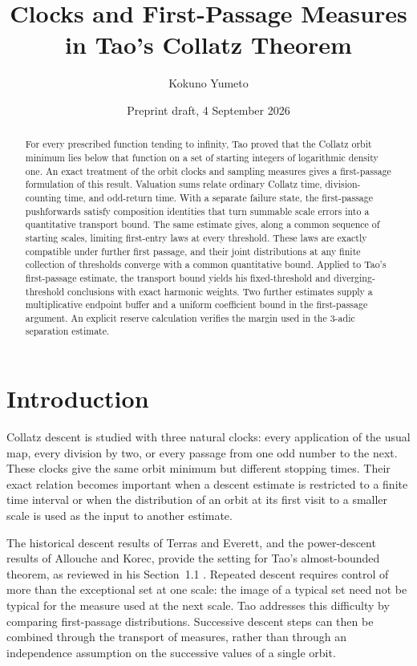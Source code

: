 \documentclass[11pt]{article}
\title{Clocks and First-Passage Measures\\in Tao's Collatz Theorem}
\author{Kokuno Yumeto}
\date{Preprint draft, 4 September 2026}
\theoremstyle{definition}
\theoremstyle{remark}
\begin{document}
\maketitle
\begin{abstract}
For every prescribed function tending to infinity, Tao proved that the
Collatz orbit minimum lies below that function on a set of starting
integers of logarithmic density one.
An exact treatment of the orbit clocks and sampling measures gives a
first-passage formulation of this result.  Valuation sums relate ordinary
Collatz time, division-counting time, and odd-return time.  With a separate
failure state, the first-passage pushforwards satisfy composition identities
that turn summable scale errors into a quantitative transport bound.  The
same estimate gives, along a common sequence of starting scales, limiting
first-entry laws at every threshold. These laws are exactly compatible
under further first passage, and their joint distributions at any finite
collection of thresholds converge with a common quantitative bound.
Applied to Tao's first-passage estimate, the transport bound
yields his fixed-threshold and diverging-threshold conclusions with exact
harmonic weights.  Two further estimates supply a multiplicative endpoint
buffer and a uniform coefficient bound in the first-passage argument.
An explicit reserve calculation verifies the margin used in the
$3$-adic separation estimate.
\end{abstract}

\section{Introduction}

Collatz descent is studied with three natural clocks: every application of
the usual map, every division by two, or every passage from one odd number
to the next.  These clocks give the same orbit minimum but different
stopping times.  Their exact relation becomes important when a descent
estimate is restricted to a finite time interval or when the distribution
of an orbit at its first visit to a smaller scale is used as the input to
another estimate.

The historical descent results of Terras and Everett, and the power-descent
results of Allouche and Korec, provide the setting for Tao's
almost-bounded theorem, as reviewed in his Section~1.1
\cite{Terras,Everett,Allouche,Korec,Tao7}.
Repeated descent requires control of more than the exceptional set at one
scale: the image of a typical set need not be typical for the measure used
at the next scale.  Tao addresses this difficulty by comparing first-passage
distributions.  Successive descent steps can then be combined through the
transport of measures, rather than through an independence assumption on
the successive values of a single orbit.
\end{document}
